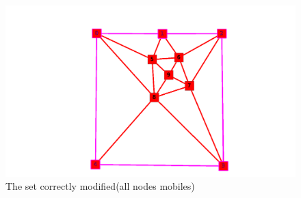 \begin{figure}[!h]
\centering
\includegraphics[scale=0.25]{snapshots/constate_nikel.png}
\caption{The set correctly modified(all nodes mobiles)}
\end{figure}

